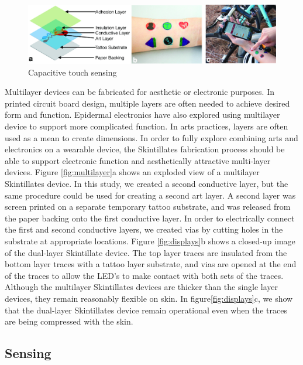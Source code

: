 \documentclass{sigchi}
\begin{document}
\begin{figure}
\centering
\includegraphics[width=1\textwidth]{figures/Figure7}
\caption{Capacitive touch sensing}
\vspace{-8pt}
\label{fig:capacitive}
\end{figure}
Multilayer devices can be fabricated for aesthetic or electronic purposes. In printed circuit board design, multiple layers are often needed to achieve desired form and function. Epidermal electronics have also explored using multilayer device to support more complicated function. In arts practices, layers are often used as a mean to create dimensions. In order to fully explore combining arts and electronics on a wearable device, the Skintillates fabrication process should be able to support electronic function and aesthetically attractive multi-layer devices. Figure \ref{fig:multilayer}a shows an exploded view of a multilayer Skintillates device. In this study, we created a second conductive layer, but the same procedure could be used for creating a second art layer. A second layer was screen printed on a separate temporary tattoo substrate, and was released from the paper backing onto the first conductive layer. In order to electrically connect the first and second conductive layers, we created vias by cutting holes in the substrate at appropriate locations. Figure \ref{fig:displays}b shows a closed-up image of the dual-layer Skintillate device. The top layer traces are insulated from the bottom layer traces with a tattoo layer substrate, and vias are opened at the end of the traces to allow the LED's to make contact with both sets of the traces. Although the multilayer Skintillates devices are thicker than the single layer devices, they remain reasonably flexible on skin. In figure\ref{fig:displays}c, we show that the dual-layer Skintillates device remain operational even when the traces are being compressed with the skin. 


\subsection{Sensing}
\end{document}
